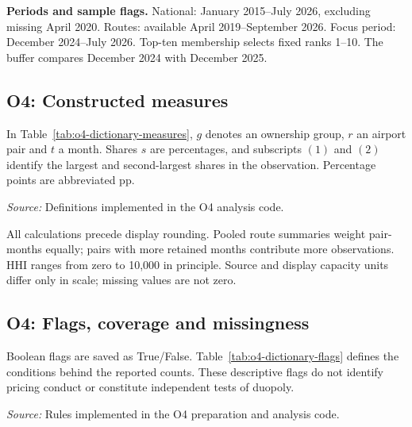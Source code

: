 \documentclass[12pt,a4paper]{article}
\begin{document}
\textbf{Periods and sample flags.} National: January 2015--July 2026, excluding missing April 2020. Routes: available April 2019--September 2026. Focus period: December 2024--July 2026. Top-ten membership selects fixed ranks 1--10. The buffer compares December 2024 with December 2025.

\clearpage
\subsection{O4: Constructed measures}
In Table~\ref{tab:o4-dictionary-measures}, $g$ denotes an ownership group, $r$ an airport pair and $t$ a month. Shares $s$ are percentages, and subscripts $(1)$ and $(2)$ identify the largest and second-largest shares in the observation. Percentage points are abbreviated pp.

\begin{minipage}{\linewidth}
\captionsetup{font=small,labelfont=bf,justification=raggedright,singlelinecheck=false,hypcap=false}
\label{tab:o4-dictionary-measures}
\centering
{\footnotesize{}\setlength{\tabcolsep}{4pt}\par}
\vspace{4pt}
{\footnotesize{}\raggedright\textit{Source:} Definitions implemented in the O4 analysis code.\par}
\end{minipage}

All calculations precede display rounding. Pooled route summaries weight pair-months equally; pairs with more retained months contribute more observations. HHI ranges from zero to 10,000 in principle. Source and display capacity units differ only in scale; missing values are not zero.

\clearpage
\subsection{O4: Flags, coverage and missingness}
Boolean flags are saved as True/False. Table~\ref{tab:o4-dictionary-flags} defines the conditions behind the reported counts. These descriptive flags do not identify pricing conduct or constitute independent tests of duopoly.

\begin{minipage}{\linewidth}
\captionsetup{font=small,labelfont=bf,justification=raggedright,singlelinecheck=false,hypcap=false}
\label{tab:o4-dictionary-flags}
\centering
{\footnotesize{}\setlength{\tabcolsep}{4pt}\par}
\vspace{4pt}
{\footnotesize{}\raggedright\textit{Source:} Rules implemented in the O4 preparation and analysis code.\par}
\end{minipage}
\end{document}
